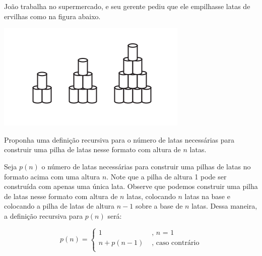 \newpage

\begin{exemplo}

João trabalha no supermercado, e seu gerente pediu que ele empilhasse latas de ervilhas como na figura abaixo.

\begin{center}
\includegraphics{images/Latas.png} 
\end{center}

Proponha uma definição recursiva para o número de latas necessárias para construir uma pilha de latas nesse formato com altura de $n$ latas. 

Seja $p(n)$ o número de latas necessárias para construir uma pilhas de latas no formato acima com uma altura $n$. Note que a pilha de altura 1 pode ser construída com apenas uma única lata.
Observe que podemos construir uma pilha de latas nesse formato com altura de $n$ latas, colocando $n$ latas na base e colocando a pilha de latas de altura $n-1$ sobre a base de $n$ latas. Dessa maneira, a definição recursiva para $p(n)$ será:

$$
p(n) = 
\begin{cases}
1 &  \text{ , $n$ =  1} \\
n + p(n-1) & \text{ , caso contrário}\\ 
\end{cases}
$$

\end{exemplo}






